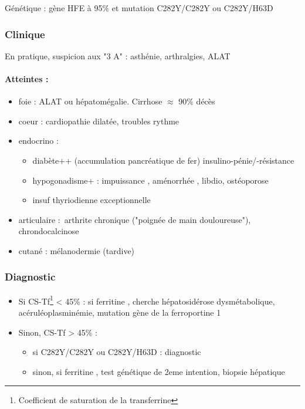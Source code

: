 \documentclass[11pt]{article}
\begin{document}
Génétique : gène HFE à 95\% et mutation C282Y/C282Y ou C282Y/H63D

\subsubsection{Clinique}
\label{sec:org6fd48b0}
En pratique, suspicion aux "3 A" : asthénie, arthralgies, \inc ALAT

\paragraph{Atteintes :}
\label{sec:orgff58357}
\begin{itemize}
\item foie : \inc ALAT ou hépatomégalie. Cirrhose \(\approx\) 90\% décès
\item coeur : cardiopathie dilatée, troubles rythme
\item endocrino :
\begin{itemize}
\item diabète++ (accumulation pancréatique de fer) insulino-pénie/-résistance
\item hypogonadisme+ : impuissance \male, aménorrhée \female, \dec libdio,
ostéoporose
\item insuf thyriodienne exceptionnelle
\end{itemize}
\item articulaire : arthrite chronique ("poignée de main douloureuse"), chrondocalcinose
\item cutané : mélanodermie (tardive)
\end{itemize}


\subsubsection{Diagnostic}
\label{sec:orgbc8e1cc}
\begin{itemize}
\item Si CS-Tf\footnote{Coefficient de saturation de la transferrine} < 45\% : si ferritine \inc, cherche hépatosidérose dysmétabolique,
acéruléoplasminémie, mutation gène de la ferroportine 1
\item Sinon, CS-Tf > 45\% : 
\begin{itemize}
\item si C282Y/C282Y ou C282Y/H63D : diagnostic
\item sinon, si ferritine \inc, test génétique de 2eme intention, biopsie
hépatique
\end{itemize}
\end{itemize}
\end{document}
